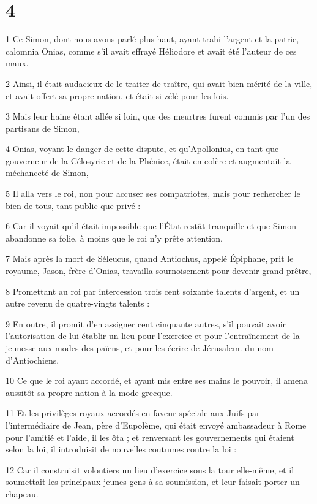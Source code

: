 \chapter{4}

\par 1 Ce Simon, dont nous avons parlé plus haut, ayant trahi l'argent et la patrie, calomnia Onias, comme s'il avait effrayé Héliodore et avait été l'auteur de ces maux.
\par 2 Ainsi, il était audacieux de le traiter de traître, qui avait bien mérité de la ville, et avait offert sa propre nation, et était si zélé pour les lois.
\par 3 Mais leur haine étant allée si loin, que des meurtres furent commis par l'un des partisans de Simon,
\par 4 Onias, voyant le danger de cette dispute, et qu'Apollonius, en tant que gouverneur de la Célosyrie et de la Phénice, était en colère et augmentait la méchanceté de Simon,
\par 5 Il alla vers le roi, non pour accuser ses compatriotes, mais pour rechercher le bien de tous, tant public que privé :
\par 6 Car il voyait qu'il était impossible que l'État restât tranquille et que Simon abandonne sa folie, à moins que le roi n'y prête attention.
\par 7 Mais après la mort de Séleucus, quand Antiochus, appelé Épiphane, prit le royaume, Jason, frère d'Onias, travailla sournoisement pour devenir grand prêtre,
\par 8 Promettant au roi par intercession trois cent soixante talents d'argent, et un autre revenu de quatre-vingts talents :
\par 9 En outre, il promit d'en assigner cent cinquante autres, s'il pouvait avoir l'autorisation de lui établir un lieu pour l'exercice et pour l'entraînement de la jeunesse aux modes des païens, et pour les écrire de Jérusalem. du nom d'Antiochiens.
\par 10 Ce que le roi ayant accordé, et ayant mis entre ses mains le pouvoir, il amena aussitôt sa propre nation à la mode grecque.
\par 11 Et les privilèges royaux accordés en faveur spéciale aux Juifs par l'intermédiaire de Jean, père d'Eupolème, qui était envoyé ambassadeur à Rome pour l'amitié et l'aide, il les ôta ; et renversant les gouvernements qui étaient selon la loi, il introduisit de nouvelles coutumes contre la loi :
\par 12 Car il construisit volontiers un lieu d'exercice sous la tour elle-même, et il soumettait les principaux jeunes gens à sa soumission, et leur faisait porter un chapeau.
